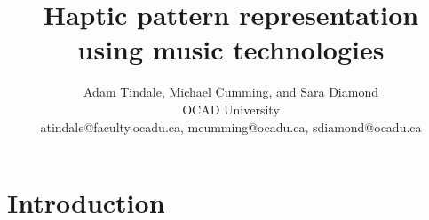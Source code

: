 \documentclass[11pt]{article}
\title{Haptic pattern representation using music technologies }
\author{Adam Tindale, Michael Cumming, and Sara Diamond\\
    OCAD University \\
    \small{atindale@faculty.ocadu.ca, mcumming@ocadu.ca, sdiamond@ocadu.ca}}
\begin{document}
\maketitle
\section{Introduction}
\end{document}
